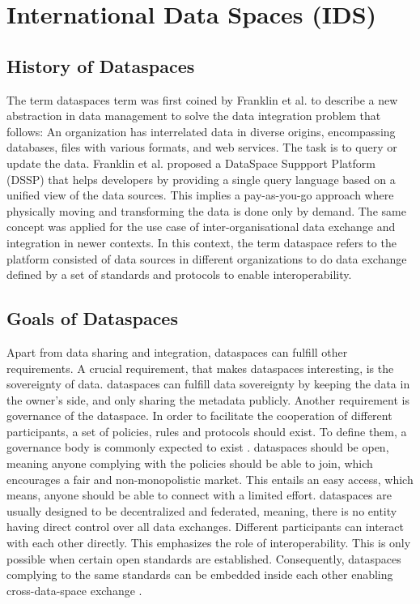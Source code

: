 \section{International Data Spaces (IDS)}
\subsection{History of Dataspaces}
The term dataspaces term was first coined by Franklin et al. \cite{franklin_databases_2005} to describe a new abstraction in data management to solve the data integration problem that follows: An organization has interrelated data in diverse origins, encompassing databases, files with various formats, and web services. The task is to query or update the data.
Franklin et al. proposed a DataSpace Suppport Platform (DSSP) that helps developers by providing a single query language based on a unified view of the data sources. This implies a pay-as-you-go approach where physically moving and transforming the data is done only by demand. The same concept was applied for the use case of inter-organisational data exchange and integration in newer contexts. In this context, the term dataspace refers to the platform consisted of data sources in different organizations to do data exchange defined by a set of standards and protocols to enable interoperability. \cite{reiberg_what_2022}

\subsection{Goals of Dataspaces}
Apart from data sharing and integration, dataspaces can fulfill other requirements.
A crucial requirement, that makes dataspaces interesting, is the sovereignty of data. dataspaces can fulfill data sovereignty by keeping the data in the owner's side, and only sharing the metadata publicly.
Another requirement is governance of the dataspace. In order to facilitate the cooperation of different participants, a set of policies, rules and protocols should exist. To define them, a governance body is commonly expected to exist \cite{reiberg_what_2022}.
dataspaces should be open, meaning anyone complying with the policies should be able to join, which encourages a fair and non-monopolistic market. This entails an easy access, which means, anyone should be able to connect with a limited effort.
dataspaces are usually designed to be decentralized and federated, meaning, there is no entity having direct control over all data exchanges. Different participants can interact with each other directly. This emphasizes the role of interoperability. This is only possible when certain open standards are established. Consequently, dataspaces complying to the same standards can be embedded inside each other enabling cross-data-space exchange \cite{reiberg_what_2022}.

